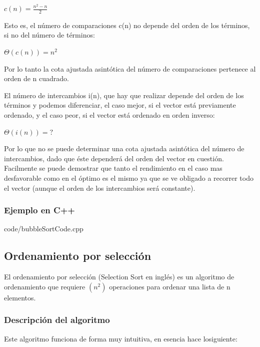 \documentclass[8pt, A4]{article}    %
\newcommand{\grisclaro}{\color[gray]{0.99}}
\newcommand{\showprog}[1]
{
\begin{minipage}{\textwidth}

 {code/#1}
\end{minipage} 
}
\begin{document}
\begin{center}
${\displaystyle c(n)={\frac {n^{2}-n}{2}}}$
\end{center}

Esto es, el número de comparaciones c(n) no depende del orden de los términos, si no del número de términos:

\begin{center}
${\displaystyle \Theta (c(n))=n^{2}\;}$
\end{center}

Por lo tanto la cota ajustada asintótica del número de comparaciones pertenece al orden de n cuadrado.

El número de intercambios i(n), que hay que realizar depende del orden de los términos y podemos diferenciar, el caso mejor, si el vector está previamente ordenado, y el caso peor, si el vector está ordenado en orden inverso:

\begin{center}
${\displaystyle \Theta (i(n))= ?\;}$
\end{center}

Por lo que no se puede determinar una cota ajustada asintótica del número de intercambios, dado que éste dependerá del orden del vector en cuestión.\\

Facilmente se puede demostrar que tanto el rendimiento en el caso mas desfavorable como en el óptimo es el mismo ya que se ve obligado a recorrer todo el vector (aunque el orden de los intercambios será constante).

\subsubsection{Ejemplo en C++}

\showprog{bubbleSortCode.cpp}

\newpage


\subsection{Ordenamiento por selección}

El ordenamiento por selección (Selection Sort en inglés) es un algoritmo de ordenamiento que requiere ${\displaystyle (n^{2})}$ operaciones para ordenar una lista de n elementos.

\subsubsection{Descripción del algoritmo}
Este algoritmo funciona de forma muy intuitiva, en esencia hace losiguiente:
\end{document}
